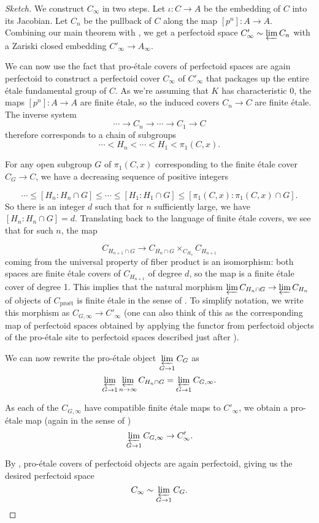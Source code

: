 \documentclass[10pt,oneside]{amsart}
\theoremstyle{definition}
\begin{document}
\begin{proof}[Sketch]
We construct $C_\infty$ in two steps. Let $\iota:C\rightarrow A$ be the embedding of $C$ into its Jacobian. Let $C_n$ be the pullback of $C$ along the map $[p^n]:A\rightarrow A$. Combining our main theorem with \cite[Lemma II.2.2]{torsion}, we get a perfectoid space $C'_\infty\sim \varprojlim C_n$ with a Zariski closed embedding $C'_\infty\rightarrow A_\infty$.

We can now use the fact that pro-\'etale covers of perfectoid spaces are again perfectoid to construct a perfectoid cover $C_\infty$ of $C'_\infty$ that packages up the entire \'etale fundamental group of $C$. As we're assuming that $K$ has characteristic 0, the maps $[p^n]:A\rightarrow A$ are finite \'etale, so the induced covers $C_n\rightarrow C$ are finite \'etale. The inverse system 
\[\cdots \rightarrow C_n \rightarrow \cdots \rightarrow C_1\rightarrow C\] 
therefore corresponds to a chain of subgroups
\[\cdots < H_n <\cdots < H_1 < \pi_1(C,x).\]

For any open subgroup $G$ of $\pi_1(C,x)$ corresponding to the finite \'etale cover $C_G\rightarrow C$, we have a decreasing sequence of positive integers 

\[\cdots \leq [H_n:H_n\cap G] \leq \cdots \leq [H_1:H_1\cap G]\leq [\pi_1(C,x):\pi_1(C,x)\cap G].\]
So there is an integer $d$ such that for $n$ sufficiently large, we have $[H_n:H_n\cap G]=d$. Translating back to the language of finite \'etale covers, we see that for such $n$, the map

\[C_{H_{n+1}\cap G}\rightarrow C_{H_n\cap G}\times_{C_{H_n}} C_{H_{n+1}}\]
coming from the universal property of fiber product is an isomorphism: both spaces are finite \'etale covers of $C_{H_{n+1}}$ of degree $d$, so the map is a finite \'etale cover of degree 1. This implies that the natural morphism $\varprojlim C_{H_n \cap G}\rightarrow \varprojlim C_{H_n}$ of objects of $C_{\text{pro\'et}}$ is finite \'etale in the sense of \cite[Definition 3.9]{p-adic_Hodge}. To simplify notation, we write this morphism as $C_{G,\infty}\rightarrow C'_\infty$ (one can also think of this as the corresponding map of perfectoid spaces obtained by applying the functor from perfectoid objects of the pro-\'etale site to perfectoid spaces described just after \cite[Lemma 4.5]{p-adic_Hodge}).

We can now rewrite the pro-\'etale object $\displaystyle\varprojlim_{G\rightarrow 1} C_G$ as \[\varprojlim_{G\rightarrow 1}\displaystyle\varprojlim_{n\rightarrow \infty} C_{H_n\cap G}=\varprojlim_{G\rightarrow 1}C_{G,\infty}.\]

As each of the $C_{G,\infty}$ have compatible finite \'etale maps to $C'_\infty$, we obtain a pro-\'etale map (again in the sense of \cite[Definition 3.9]{p-adic_Hodge}) 
\[\varprojlim_{G\rightarrow 1}C_{G,\infty}\rightarrow C'_\infty.\]

By \cite[Lemma 4.6]{p-adic_Hodge}, pro-\'etale covers of perfectoid objects are again perfectoid, giving us the desired perfectoid space 
\[ C_\infty\sim\varprojlim_{G\rightarrow 1} C_G.\]

\end{proof}
\end{document}
